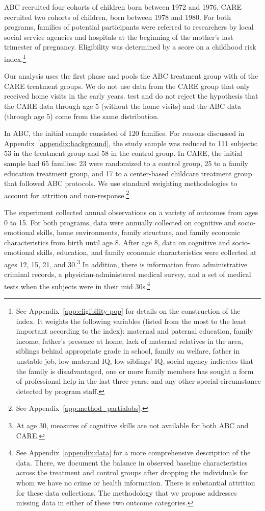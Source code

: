 ABC recruited four cohorts of children born between 1972 and 1976. CARE recruited two cohorts of children, born between 1978 and 1980. For both programs, families of potential participants were referred to researchers by local social service agencies and hospitals at the beginning of the mother's last trimester of pregnancy. Eligibility was determined by a score on a childhood risk index.\footnote{See  Appendix~\ref{app:eligibility-pop} for details on the construction of the index. It weights the following variables (listed from the most to the least important according to the index): maternal and paternal education, family income, father's presence at home, lack of maternal relatives in the area, siblings behind appropriate grade in school, family on welfare, father in unstable job, low maternal IQ, low siblings' IQ, social agency indicates that the family is disadvantaged, one or more family members has sought a form of professional help in the last three years, and any other special circumstance detected by program staff.}

Our analysis uses the first phase and pools the ABC treatment group with of the CARE treatment groups. We do not use data from the CARE group that only received home visits in the early years. \cite{Campbell_Conti_etal_2014_EarlyChildhoodInvestments} test and do not reject the hypothesis that the CARE data through age 5 (without the home visits) and the ABC data (through age 5) come from the same distribution.

In ABC, the initial sample consisted of 120 families. For reasons discussed in Appendix~\ref{appendix:background}, the study sample was reduced to 111 subjects: 53 in the treatment group and 58 in the control group. In CARE, the initial sample had 65 families: 23 were randomized to a control group, 25 to a family education treatment group, and 17 to a center-based childcare treatment group that followed ABC protocols. We use standard weighting methodologies to account for attrition and non-response.\footnote{See Appendix~\ref{app:method_partialobs}.}

The experiment collected annual observations on a variety of outcomes from ages 0 to 15. For both programs, data were annually collected on cognitive and socio-emotional skills, home environments, family structure, and family economic characteristics from birth until age 8. After age 8, data on cognitive and socio-emotional skills, education, and family economic characteristics were collected at ages 12, 15, 21, and 30.\footnote{At age 30, measures of cognitive skills are not available for both ABC and CARE.} In addition, there is information from administrative criminal records, a physician-administered medical survey, and a set of medical tests when the subjects were in their mid 30s.\footnote{See  Appendix~\ref{appendix:data} for a more comprehensive description of the data. There, we document the balance in observed baseline characteristics across the treatment and control groups after dropping the individuals for whom we have no crime or health information. There is substantial attrition for these data collections. The methodology that we propose addresses missing data in either of these two outcome categories.}

